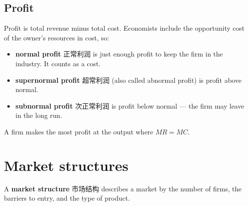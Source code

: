 \documentclass[11pt]{article}
\begin{document}
\subsection*{Profit}

Profit is total revenue minus total cost. Economists include the opportunity cost of the owner's resources in cost, so:

\begin{itemize}
\item \textbf{normal profit} 正常利润 is just enough profit to keep the firm in the industry. It counts as a cost.

\item \textbf{supernormal profit} 超常利润 (also called abnormal profit) is profit above normal.

\item \textbf{subnormal profit} 次正常利润 is profit below normal — the firm may leave in the long run.

\end{itemize}

A firm makes the most profit at the output where $MR = MC$.

\section*{Market structures}

A \textbf{market structure} 市场结构 describes a market by the number of firms, the barriers to entry, and the type of product.

\begin{center}
\end{center}
\end{document}

